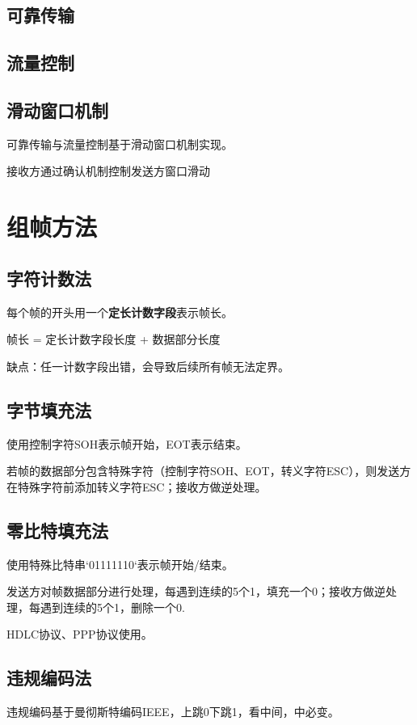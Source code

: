 \subsection{可靠传输}



\subsection{流量控制}


\subsection{滑动窗口机制}
可靠传输与流量控制基于滑动窗口机制实现。

接收方通过确认机制控制发送方窗口滑动


\section{组帧方法}


\subsection{字符计数法}
每个帧的开头用一个\textbf{定长计数字段}表示帧长。

帧长 = 定长计数字段长度 + 数据部分长度

缺点：任一计数字段出错，会导致后续所有帧无法定界。


\subsection{字节填充法}
使用控制字符SOH表示帧开始，EOT表示结束。

若帧的数据部分包含特殊字符（控制字符SOH、EOT，转义字符ESC），则发送方在特殊字符前添加转义字符ESC；接收方做逆处理。


\subsection{零比特填充法}
使用特殊比特串`01111110`表示帧开始/结束。

发送方对帧数据部分进行处理，每遇到连续的5个1，填充一个0；接收方做逆处理，每遇到连续的5个1，删除一个0.

HDLC协议、PPP协议使用。


\subsection{违规编码法}
违规编码基于曼彻斯特编码IEEE，上跳0下跳1，看中间，中必变。

